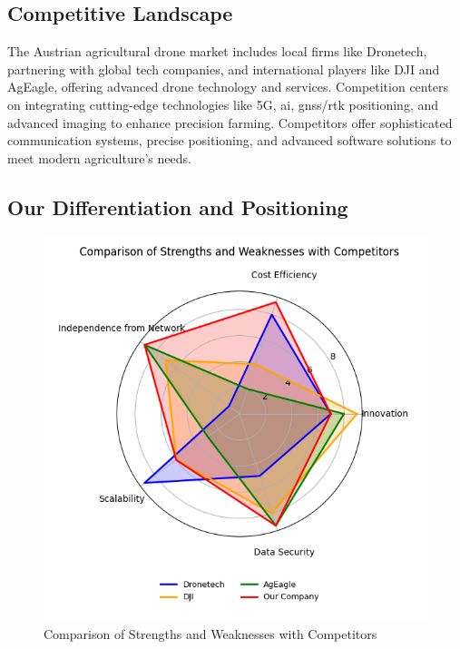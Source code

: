 \subsection{Competitive Landscape}

The Austrian agricultural drone market includes local firms like Dronetech, partnering with global tech companies, and international players like DJI and AgEagle, offering advanced drone technology and services. Competition centers on integrating cutting-edge technologies like 5G, \acrshort{ai}, \acrshort{gnss}/\acrshort{rtk} positioning, and advanced imaging to enhance precision farming. Competitors offer sophisticated communication systems, precise positioning, and advanced software solutions to meet modern agriculture's needs.

\subsection{Our Differentiation and Positioning}

\begin{figure}[H] 
	\centering 
	\hspace*{-1.5cm} 
	\includegraphics[width=400pt]{figures/competitors.png} 
	\caption{Comparison of Strengths and Weaknesses with Competitors}
	\label{fig:strengths_weaknesses} 
\end{figure}

